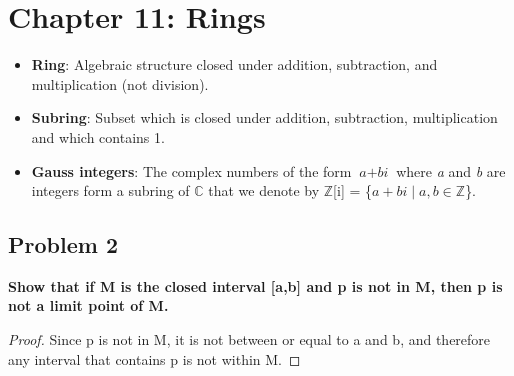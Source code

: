 \documentclass[12pt]{article}
\begin{document}
\section*{Chapter 11: Rings}

\begin{itemize}
  \item \textbf{Ring}: Algebraic structure closed under addition, subtraction, and multiplication (not division).
  \item \textbf{Subring}: Subset which is closed under addition, subtraction, multiplication and which contains 1.
  \item \textbf{Gauss integers}: The complex numbers of the form $\textit{a} + \textit{bi}$ where \textit{a} and \textit{b} are integers form a subring of $\mathbb{C}$ that we denote by $\mathbb{Z}$[i] = \{$\textit{a} + \textit{bi} \mid \textit{a}, \textit{b} \in \mathbb{Z}$\}.
\end{itemize}

\subsection*{Problem 2}
\textbf{Show that if M is the closed interval [a,b] and p is not in M, then p is not a limit point of M.}
\begin{proof}
Since p is not in M, it is not between or equal to a and b, and therefore any interval that contains p is not within M.
\end{proof}
\end{document}

